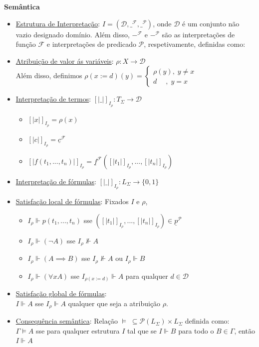 \documentclass{article}
\begin{document}
\textbf{Semântica}
\begin{itemize}
    \item \underline{Estrutura de Interpretação}: $I=(\mathcal{D}, \_{^\mathcal{F}},\_^\mathcal{P})$, onde $\mathcal{D}$ é um conjunto não vazio designado domínio. Além disso, $-^\mathcal{F} \text{ e } -^\mathcal{P}$ são as interpretações de função $\mathcal{F}$ e interpretações de predicado $\mathcal{P}$, respetivamente, definidas como:

    \item \underline{Atribuição de valor ás variáveis}: $\rho: X \rightarrow\mathcal{D}$\\
    Além disso, definimos $\rho(x:= d)(y)=
        \begin{cases}
            \rho(y),\;y\neq x\\
            d\;\;\;\,\;,\;y=x
        \end{cases}$

    \item \underline{Interpretação de termos}: $[|\_|]_{I_\rho}: T_\Sigma \rightarrow \mathcal{D}$
        \begin{itemize}
            \renewcommand{\labelitemi}{-}
            \item $[|x|]_{I_\rho}=\rho(x)$
            \item $[|c|]_{I_\rho}=\underline{c}^\mathcal{F}$
            \item $[|f(t_1,...,t_n)|]_{I_\rho}=\underline{f}^\mathcal{F}([|t_1|]_{I_\rho},...,[|t_n|]_{I_\rho})$
        \end{itemize}

    \item \underline{Interpretação de fórmulas}: $[|\_|]_{I_\rho}: L_\Sigma \rightarrow\{0,1\}$

    \item \underline{Satisfação local de fórmulas}: Fixados $I$ e $\rho$, 
        \begin{itemize}
            \renewcommand{\labelitemi}{-}
            \item $I_\rho \Vdash p(t_1,...,t_n)$ sse $([|t_1|]_{I_\rho},...,[|t_n|]_{I_\rho}) \in \underline{p}^\mathcal{P}$
            \item $I_\rho \Vdash (\neg A)$ sse $I_\rho \nVdash A$ 
            \item $I_\rho \Vdash (A \implies B)$ sse $I_\rho \nVdash A$ ou $I_\rho \Vdash B$
            \item $I_\rho \Vdash  (\forall x A)$ sse $I_{\rho(x:=d)} \Vdash A$ para qualquer $d \in \mathcal{D}$
        \end{itemize}

    \item \underline{Satisfação global de fórmulas}:\\
    $I \Vdash A$ sse $I_\rho \Vdash A$ qualquer que seja a atribuição $\rho$.

    \item \underline{Consequência semântica}: Relação $\models \; \subseteq \mathcal{P}(L_\Sigma) \times L_\Sigma$ definida como:\\
    $\Gamma \models A $ sse para qualquer estrutura $I$ tal que se $I \Vdash B$ para todo o $B \in \Gamma$, então $I \Vdash A$
\end{itemize}
\end{document}
